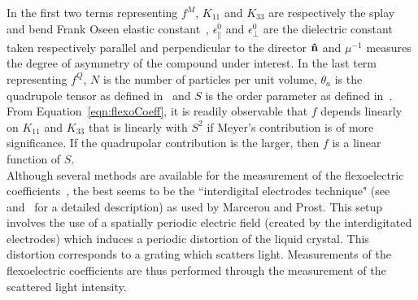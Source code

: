 In the first two terms representing $f^M$, $K_{11}$ and $K_{33}$ are respectively the splay 
and bend Frank Oseen elastic constant~\cite{deGennes}, $\epsilon^0_\parallel$ and 
$\epsilon^0_\perp$ are the dielectric constant taken respectively parallel and perpendicular to 
the director $\mathbf{\hat{n} }$ and $\mu^{-1}$ measures the degree of asymmetry of the compound under 
interest. In the last term representing $f^Q$, $N$ is the number of particles per unit volume,
$\theta_a$ is the quadrupole tensor as defined in~\cite{ProstMarcerou77} and $S$ is the order
parameter as defined in~\cite{deGennes}.\\

From Equation~\ref{eqn:flexoCoeff}, it is readily observable that $f$ depends linearly 
on $K_{11}$ and $K_{33}$ that is
linearly with $S^2$ if Meyer's contribution is of more significance. If the quadrupolar
contribution is the larger, then $f$ is a linear function of $S$.\\

Although several methods are available for the measurement of the flexoelectric
coefficients~\cite{deGennes,LiquidCrystals,MazzullaGiuchi00,JewellSambles02}, the best seems to be 
the ``interdigital electrodes technique" (see~\cite{ProstPershan76} and~\cite{MarcerouProst80} 
for a detailed description) as used by Marcerou and Prost. This setup involves the use of
a spatially periodic electric field (created by the interdigitated electrodes) which induces a 
periodic distortion of the liquid crystal.  This distortion corresponds to a grating which scatters 
light.  Measurements of the flexoelectric coefficients are thus performed through the measurement 
of the scattered light intensity.\\

